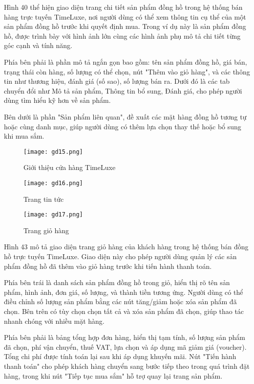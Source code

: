 Hình 40 thể hiện giao diện trang chi tiết sản phẩm đồng hồ trong hệ thống bán hàng trực tuyến TimeLuxe, nơi người dùng có thể xem thông tin cụ thể của một sản phẩm đồng hồ trước khi quyết định mua. Trong ví dụ này là sản phẩm đồng hồ, được trình bày với hình ảnh lớn cùng các hình ảnh phụ mô tả chi tiết từng góc cạnh và tính năng.

Phía bên phải là phần mô tả ngắn gọn bao gồm: tên sản phẩm đồng hồ, giá bán, trạng thái còn hàng, số lượng có thể chọn, nút "Thêm vào giỏ hàng", và các thông tin như thương hiệu, đánh giá (số sao), số lượng bán ra. Dưới đó là các tab chuyển đổi như Mô tả sản phẩm, Thông tin bổ sung, Đánh giá, cho phép người dùng tìm hiểu kỹ hơn về sản phẩm.

Bên dưới là phần "Sản phẩm liên quan", đề xuất các mặt hàng đồng hồ tương tự hoặc cùng danh mục, giúp người dùng có thêm lựa chọn thay thế hoặc bổ sung khi mua sắm.

\begin{figure}[H]
  \centering
  \texttt{[image: gd15.png]}
  \caption{Giới thiệu cửa hàng TimeLuxe}
  \label{fig:customer-about}
\end{figure}

\begin{figure}[H]
  \centering
  \texttt{[image: gd16.png]}
  \caption{Trang tin tức}
  \label{fig:customer-news}
\end{figure}

\begin{figure}[H]
  \centering
  \texttt{[image: gd17.png]}
  \caption{Trang giỏ hàng}
  \label{fig:customer-cart}
\end{figure}

Hình 43 mô tả giao diện trang giỏ hàng của khách hàng trong hệ thống bán đồng hồ trực tuyến TimeLuxe. Giao diện này cho phép người dùng quản lý các sản phẩm đồng hồ đã thêm vào giỏ hàng trước khi tiến hành thanh toán.

Phía bên trái là danh sách sản phẩm đồng hồ trong giỏ, hiển thị rõ tên sản phẩm, hình ảnh, đơn giá, số lượng, và thành tiền tương ứng. Người dùng có thể điều chỉnh số lượng sản phẩm bằng các nút tăng/giảm hoặc xóa sản phẩm đã chọn. Bên trên có tùy chọn chọn tất cả và xóa sản phẩm đã chọn, giúp thao tác nhanh chóng với nhiều mặt hàng.

Phía bên phải là bảng tổng hợp đơn hàng, hiển thị tạm tính, số lượng sản phẩm đã chọn, phí vận chuyển, thuế VAT, lựa chọn và áp dụng mã giảm giá (voucher). Tổng chi phí được tính toán lại sau khi áp dụng khuyến mãi. Nút "Tiến hành thanh toán" cho phép khách hàng chuyển sang bước tiếp theo trong quá trình đặt hàng, trong khi nút "Tiếp tục mua sắm" hỗ trợ quay lại trang sản phẩm.

